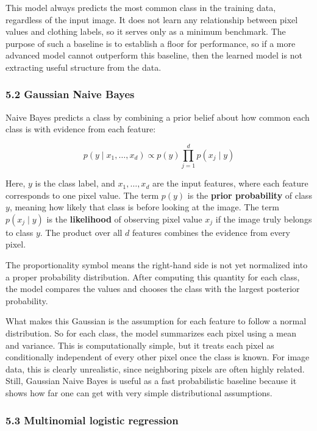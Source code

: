 \documentclass[11pt]{article}
\begin{document}
This model always predicts the most common class in the training data,
regardless of the input image. It does not learn any relationship
between pixel values and clothing labels, so it serves only as a minimum
benchmark. The purpose of such a baseline is to establish a floor for
performance, so if a more advanced model cannot outperform this
baseline, then the learned model is not extracting useful structure from
the data.

\subsubsection{5.2 Gaussian Naive Bayes}\label{gaussian-naive-bayes}

Naive Bayes predicts a class by combining a prior belief about how
common each class is with evidence from each feature:

\[
p(y \mid x_1, \dots, x_d) \propto p(y) \prod_{j=1}^{d} p(x_j \mid y)
\]

Here, \(y\) is the class label, and \(x_1, \dots, x_d\) are the input
features, where each feature corresponds to one pixel value. The term
\(p(y)\) is the \textbf{prior probability} of class \(y\), meaning how
likely that class is before looking at the image. The term
\(p(x_j \mid y)\) is the \textbf{likelihood} of observing pixel value
\(x_j\) if the image truly belongs to class \(y\). The product over all
\(d\) features combines the evidence from every pixel.

The proportionality symbol means the right-hand side is not yet
normalized into a proper probability distribution. After computing this
quantity for each class, the model compares the values and chooses the
class with the largest posterior probability.

What makes this Gaussian is the assumption for each feature to follow a
normal distribution. So for each class, the model summarizes each pixel
using a mean and variance. This is computationally simple, but it treats
each pixel as conditionally independent of every other pixel once the
class is known. For image data, this is clearly unrealistic, since
neighboring pixels are often highly related. Still, Gaussian Naive Bayes
is useful as a fast probabilistic baseline because it shows how far one
can get with very simple distributional assumptions.

\subsubsection{5.3 Multinomial logistic
regression}\label{multinomial-logistic-regression}
\end{document}
